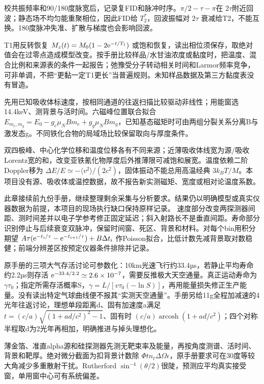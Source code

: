 校共振频率和90/180度脉宽后，记录复FID和脉冲时序。$\pi/2-\tau-\pi$在 $2\tau$附近回波；静态场不均匀能重聚相位，因此FID给 $T_2^*$，回波振幅对 $2\tau$ 衰减给T2，不能互换。180度脉冲失准、扩散与梯度也会影响回波。

T1用反转恢复 $M_z(t)=M_0(1-2\mathrm e^{-t/T_1})$ 或饱和恢复，读出相位须保存，取绝对值会在过零点造成模型改变。按手册比较样品/水甘油浓度或黏度时，把温度、混合比例和来源表的条件一起报告；弛豫受分子转动相关时间和Larmor频率竞争，可非单调，不把“更黏一定T1更长”当普遍规则。未知样品数据及第三方黏度表没有冒造。

先用已知吸收体标速度，按相同通道的往返扫描比较驱动非线性；用能窗选14.4keV、测背景与活时间。六磁峰位置联合拟合 $E_{m_e,m_g}=E_0-g_e\mu_NBm_e+g_g\mu_NBm_g$，已知基态磁矩时可由两组分裂关系分离B与激发态g。不同铁化合物的局域场比较保留取向与厚度条件。

双四极峰、中心化学位移和温度位移各有不同来源；近薄吸收体线宽为源/吸收Lorentz宽的和，改变亚铁氰化物厚度后外推薄限可减饱和展宽。温度依赖二阶Doppler移为 $\Delta E/E\simeq-\langle v^2\rangle/(2c^2)$，固体振动不能总用高温经典 $3k_BT/M$。本项目没有源、吸收体或温控数据，故不报告新实测磁矩、宽度或相对论温度系数。

此章接续前九份手册，继续整理剩余采集与分析要求。结果仍以明确模型或真实仪器数据为前提，本项目的现场执行缺口保持原样记录。
速度部分改变两探测器间距、测时间差并以电子学参考修正固定延迟；斜入射路长不是垂直间距。寿命部分识别停止与后续衰变双脉冲，保留时间窗、死区、背景和材料。对每个bin用积分期望 $A\tau(\mathrm e^{-t_i/\tau}-\mathrm e^{-t_{i+1}/\tau})+B\Delta t_i$ 作Poisson拟合，比低计数先减背景取对数稳健；前端分辨差区按预定仪器条件排除并记录。

原手册的三项大气存活讨论可参数化：10km光速飞行约33.4µs，若静止平均寿命约2.2µs则存活 $\mathrm e^{-33.4/2.2}\simeq2.6\times10^{-7}$，需要反推极大天空通量。真正运动寿命为 $\gamma\tau_0$；指定所需存活概率S，$\gamma=L/[v\tau_0(-\ln S)]$，再用能量损失修正生产能量。没有读出特定气球曲线便不报其“实测天空通量”。手册另给11g全程加减速的4光年往返讨论，理想单段距离d、固有加速度a满足 $t=(c/a)\sqrt{(1+ad/c^2)^2-1}$、固有时 $(c/a)\operatorname{arcosh}(1+ad/c^2)$；四个对称半程取d为2光年再相加，明确推进与掉头理想化。

薄金箔、准直alpha源和硅探测器先测无靶束率及能量，再按角度测谱、活时间、背景和靶厚。绝对微分截面为扣背景计数除 $\Phi t n_t\Delta\Omega\epsilon$，原手册要求可在30度等较大角减少多重散射干扰。Rutherford $\sin^{-4}(\theta/2)$很陡，预测应平均真实接受窗，单用窗中心可有系统偏差。

